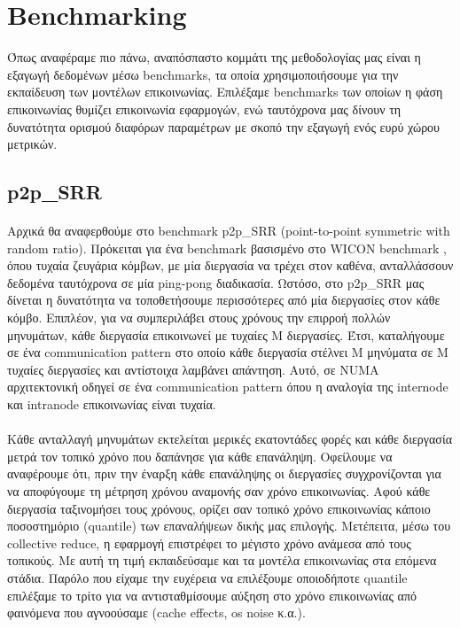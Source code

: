 \paragraph{}
\section{Benchmarking}
Όπως αναφέραμε πιο πάνω, αναπόσπαστο κομμάτι της μεθοδολογίας μας είναι η εξαγωγή δεδομένων μέσω benchmarks, τα οποία  χρησιμοποιήσουμε για την εκπαίδευση των μοντέλων επικοινωνίας. Επιλέξαμε benchmarks των οποίων η φάση επικοινωνίας θυμίζει επικοινωνία εφαρμογών, ενώ ταυτόχρονα μας δίνουν τη δυνατότητα ορισμού διαφόρων παραμέτρων με σκοπό την εξαγωγή ενός ευρύ χώρου μετρικών.

\subsection{p2p\_SRR}
\paragraph{}
Αρχικά θα αναφερθούμε στο benchmark p2p\_SRR (point-to-point symmetric with random ratio). Πρόκειται για ένα benchmark βασισμένο στο WICON benchmark \cite{WICON}, όπου τυχαία ζευγάρια κόμβων, με μία διεργασία να τρέχει στον καθένα, ανταλλάσσουν δεδομένα ταυτόχρονα σε μία ping-pong διαδικασία. Ωστόσο, στο p2p\_SRR μας δίνεται η δυνατότητα να τοποθετήσουμε περισσότερες από μία διεργασίες στον κάθε κόμβο. Επιπλέον, για να συμπεριλάβει στους χρόνους την επιρροή πολλών μηνυμάτων, κάθε διεργασία επικοινωνεί με τυχαίες M διεργασίες. Έτσι, καταλήγουμε σε ένα communication pattern στο οποίο κάθε διεργασία στέλνει M μηνύματα σε Μ τυχαίες διεργασίες και αντίστοιχα λαμβάνει απάντηση. Αυτό, σε NUMA αρχιτεκτονική οδηγεί σε ένα communication pattern όπου η αναλογία της internode και intranode επικοινωνίας είναι τυχαία.

\paragraph{}
Κάθε ανταλλαγή μηνυμάτων εκτελείται μερικές εκατοντάδες φορές και κάθε διεργασία μετρά τον τοπικό χρόνο που δαπάνησε για κάθε επανάληψη. Οφείλουμε να αναφέρουμε ότι, πριν την έναρξη κάθε επανάληψης οι διεργασίες συγχρονίζονται για να αποφύγουμε τη μέτρηση χρόνου αναμονής σαν χρόνο επικοινωνίας.  Αφού κάθε διεργασία ταξινομήσει τους χρόνους, ορίζει σαν τοπικό χρόνο επικοινωνίας  κάποιο ποσοστημόριο (quantile) των επαναλήψεων δικής μας επιλογής. Μετέπειτα, μέσω του collective reduce, η εφαρμογή επιστρέφει το μέγιστο χρόνο ανάμεσα από τους τοπικούς. Με αυτή τη τιμή εκπαιδεύσαμε και τα μοντέλα επικοινωνίας στα επόμενα στάδια. Παρόλο που είχαμε την ευχέρεια να επιλέξουμε οποιοδήποτε quantile επιλέξαμε το τρίτο  για να αντισταθμίσουμε αύξηση στο χρόνο επικοινωνίας από φαινόμενα που αγνοούσαμε (cache effects, os noise κ.α.). 
